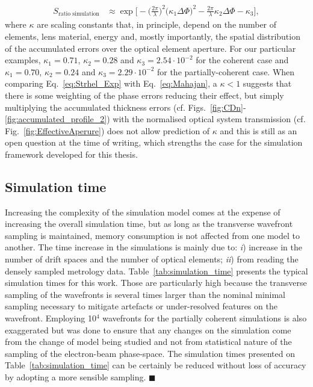 \begin{refsection}
\begin{align}\label{eq:Strhel_Exp}
    S_{\text{ratio simulation}}&\approx\exp{\bigg[- \bigg(\frac{2\pi}{\lambda}\bigg)^2\big(\kappa_1\Delta\Phi\big)^2-\frac{2\pi}{\lambda}\kappa_2\Delta\Phi-\kappa_3\bigg]},
\end{align}
where $\kappa$ are scaling constants that, in principle, depend on the number of elements, lens material, energy and, mostly importantly, the spatial distribution of the accumulated errors over the optical element aperture. For our particular examples, $\kappa_1=0.71$, $\kappa_2=0.28$ and $\kappa_3=2.54\cdot10^{-2}$ for the coherent case and $\kappa_1=0.70$, $\kappa_2=0.24$ and $\kappa_3=2.29\cdot10^{-2}$ for the partially-coherent case. When comparing Eq.~\ref{eq:Strhel_Exp} with Eq.~\ref{eq:Mahajan}, a $\kappa<1$ suggests that there is some weighting of the phase errors reducing their effect, but simply multiplying the accumulated thickness errors (cf. Figs.~\ref{fig:CDn}-\ref{fig:accumulated_profile_2}) with the normalised optical system transmission (cf. Fig.~\ref{fig:EffectiveAperure}) does not allow prediction of $\kappa$ and this is still as an open question at the time of writing, which strengths the case for the simulation framework developed for this thesis.

\subsection{Simulation time}\label{section:discussion_time}

Increasing the complexity of the simulation model comes at the expense of increasing the overall simulation time, but as long as the transverse wavefront sampling is maintained, memory consumption is not affected from one model to another. The time increase in the simulations is mainly due to: \textit{i}) increase in the number of drift spaces and the number of optical elements; \textit{ii}) from reading the densely sampled metrology data. Table~\ref{tab:simulation_time} presents the typical simulation times for this work. Those are particularly high because the transverse sampling of the wavefronts is several times larger than the nominal minimal sampling necessary to mitigate artefacts or under-resolved features on the wavefront. Employing 10$^{4}$ wavefronts for the partially coherent simulations is also exaggerated but was done to ensure that any changes on the simulation come from the change of model being studied and not from statistical nature of the sampling of the electron-beam phase-space. The simulation times presented on Table~\ref{tab:simulation_time} can be certainly be reduced without loss of accuracy by adopting a more sensible sampling. $\blacksquare$


\end{refsection}
